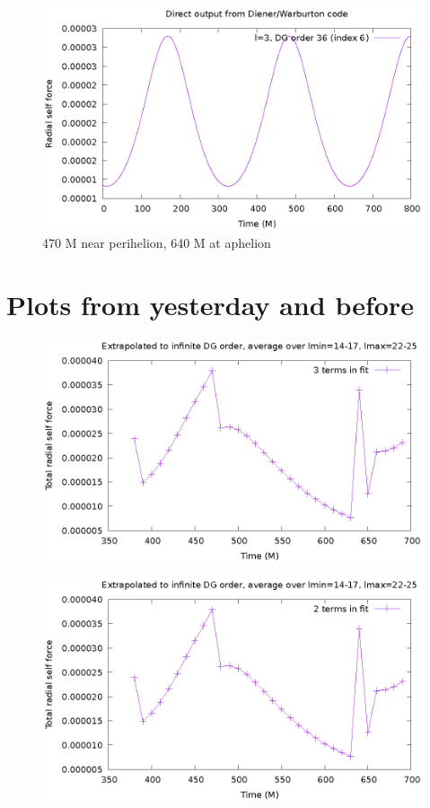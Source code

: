\documentclass{article}
\begin{document}
\begin{figure}
  \includegraphics{psirl_l3_order36}
  \caption{470 M near perihelion, 640 M at aphelion}
\end{figure}

\section{Plots from yesterday and before}

\begin{figure}
  \includegraphics{selfforceavgsmallrange3term}
\end{figure}
\begin{figure}
  \includegraphics{selfforceavgsmallrange4term}
\end{figure}
\end{document}
